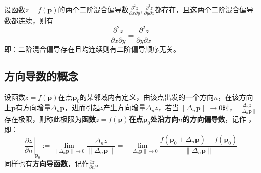 \begin{theorem}[二阶混偏相等定理]
设函数$z=f\left( \boldsymbol{p} \right) $的两个二阶混合偏导数$\frac{\partial ^2z}{\partial x\partial y},\frac{\partial ^2z}{\partial y\partial x}$都存在，且这两个二阶混合偏导数都连续，则有
\[
\frac{\partial ^2z}{\partial x\partial y}=\frac{\partial ^2z}{\partial y\partial x}
\]
即：二阶混合偏导存在且均连续则有二阶偏导顺序无关。
\end{theorem}

\subsection{方向导数的概念}

\begin{definition}[方向导数]
设函数$z=f\left( \boldsymbol{p} \right) $在点$\boldsymbol{p}_0$的某邻域内有定义，由该点出发的一个方向$n$，在该方向上$\boldsymbol{p}$有方向增量$\Delta _n\boldsymbol{p}$，进而引起$z$产生方向增量$\Delta _nz$，若当$\left\| \Delta _n\boldsymbol{p} \right\| \rightarrow 0$时，$\frac{\Delta _nz}{\left\| \Delta _n\boldsymbol{p} \right\|}$存在极限，则称此极限为{\bf 函数$z=f\left( \boldsymbol{p} \right) $在点$\boldsymbol{p}_0$处沿方向$n$的方向偏导数}，记作 ，即：
\[
\left. \frac{\partial z}{\partial n} \right|_{\boldsymbol{p}_0}:=\lim_{\left\| \Delta _n\boldsymbol{p} \right\| \rightarrow 0} \frac{\Delta _nz}{\left\| \Delta _n\boldsymbol{p} \right\|}=\lim_{\left\| \Delta _n\boldsymbol{p} \right\| \rightarrow 0} \frac{f\left( \boldsymbol{p}_0+\Delta _n\boldsymbol{p} \right) -f\left( \boldsymbol{p}_0 \right)}{\left\| \Delta _n\boldsymbol{p} \right\|}
\]
同样也有{\bf 方向导函数}，记作$\frac{\partial z}{\partial n}$。
\end{definition}





